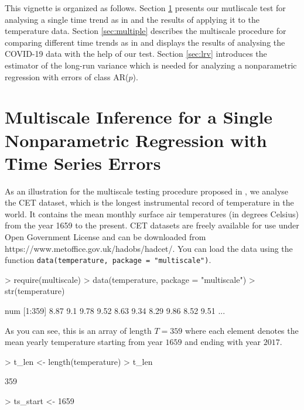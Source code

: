 \documentclass[a4paper]{scrartcl}
\begin{document}
This vignette is organized as follows. Section \ref{sec:single} presents our mutliscale test for analysing a single time trend as in\cite{KhismatullinaVogt2020a} and the results of applying it to the temperature data. Section \ref{sec:multiple} describes the multiscale procedure for comparing different time trends as in \cite{KhismatullinaVogt2020b} and displays the results of analysing the COVID-19 data with the help of our test. Section \ref{sec:lrv} introduces the estimator of the long-run variance which is needed for analyzing a nonparametric regression with errors of class AR($p$). %


\section{Multiscale Inference for a Single Nonparametric Regression with Time Series Errors}\label{sec:single}

As an illustration for the multiscale testing procedure proposed in \cite{KhismatullinaVogt2020a}, we analyse the CET dataset, which is the longest instrumental record of temperature in the world. It contains the mean monthly surface air temperatures (in degrees Celsius) from the year 1659 to the present. CET datasets are freely available for use under Open Government License and can be downloaded from https://www.metoffice.gov.uk/hadobs/hadcet/. You can load the data using the function \verb|data(temperature, package = "multiscale")|.

\begin{Schunk}
\begin{Sinput}
> require(multiscale)
> data(temperature, package = "multiscale")
> str(temperature)
\end{Sinput}
\begin{Soutput}
 num [1:359] 8.87 9.1 9.78 9.52 8.63 9.34 8.29 9.86 8.52 9.51 ...
\end{Soutput}
\end{Schunk}

As you can see, this is an array of length $T = 359$ where each element denotes the mean yearly temperature starting from year $1659$ and ending with year $2017$.

\begin{Schunk}
\begin{Sinput}
> t_len    <- length(temperature)
> t_len
\end{Sinput}
\begin{Soutput}
[1] 359
\end{Soutput}
\begin{Sinput}
> ts_start <- 1659
\end{Sinput}
\end{Schunk}
\end{document}
